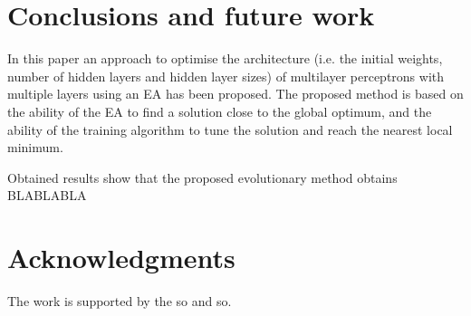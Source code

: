 \documentclass[runningheads]{llncs}
\begin{document}


\section{Conclusions and future work}
\label{sec:conclus}

In this paper an approach to optimise the architecture (i.e. the initial weights, number of hidden layers and hidden layer sizes) of multilayer perceptrons with multiple layers using an EA has been proposed. %
The proposed method is based on the ability of the EA to find a solution close to the global optimum, and the ability of the training algorithm to tune the solution and reach the nearest local minimum.

Obtained results show that the proposed evolutionary method obtains BLABLABLA %


\section*{Acknowledgments}

The work is
supported by the so and so.



 
\end{document}
